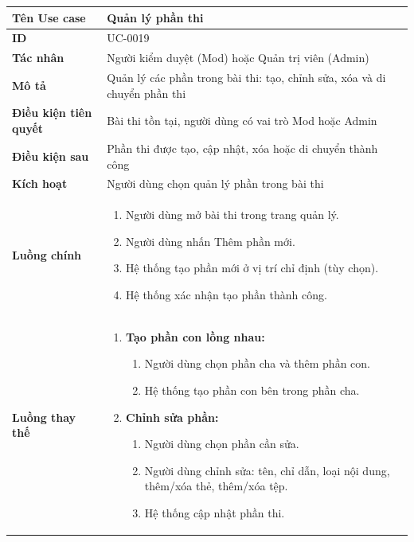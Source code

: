 {
\renewcommand{\arraystretch}{1.5}

\begin{tabularx}{\textwidth}{|>{\raggedright\arraybackslash}X|>{\raggedright\arraybackslash}X|}
\hline
\textbf{Tên Use case} & Quản lý phần thi \\
\hline
\textbf{ID} & UC-0019 \\
\hline
\textbf{Tác nhân} & Người kiểm duyệt (Mod) hoặc Quản trị viên (Admin) \\
\hline
\textbf{Mô tả} & Quản lý các phần trong bài thi: tạo, chỉnh sửa, xóa và di chuyển phần thi \\
\hline
\textbf{Điều kiện tiên quyết} & Bài thi tồn tại, người dùng có vai trò Mod hoặc Admin \\
\hline
\textbf{Điều kiện sau} & Phần thi được tạo, cập nhật, xóa hoặc di chuyển thành công \\
\hline
\textbf{Kích hoạt} & Người dùng chọn quản lý phần trong bài thi \\
\hline
\textbf{Luồng chính} &
\begin{enumerate}
    \item Người dùng mở bài thi trong trang quản lý.
    \item Người dùng nhấn Thêm phần mới.
    \item Hệ thống tạo phần mới ở vị trí chỉ định (tùy chọn).
    \item Hệ thống xác nhận tạo phần thành công.
\end{enumerate} \\
\hline
\textbf{Luồng thay thế} &
\begin{enumerate}
    \item \textbf{Tạo phần con lồng nhau:}
    \begin{enumerate}
        \item[2A.] Người dùng chọn phần cha và thêm phần con.
        \item[3A.] Hệ thống tạo phần con bên trong phần cha.
    \end{enumerate}
    \item \textbf{Chỉnh sửa phần:}
    \begin{enumerate}
        \item[2B.] Người dùng chọn phần cần sửa.
        \item[3B.] Người dùng chỉnh sửa: tên, chỉ dẫn, loại nội dung, thêm/xóa thẻ, thêm/xóa tệp.
        \item[4B.] Hệ thống cập nhật phần thi.
    \end{enumerate}

\end{enumerate}
\end{tabularx}}

